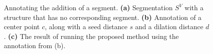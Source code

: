 \documentclass[]{spie}  %
\begin{document}
\begin{figure}[htbp]
\centering
{}
\hspace{0.1em}
\hspace{0.1em}
\caption{Annotating the addition of a segment.  \textbf{(a)}
  Segmentation $S^V$ with a structure that has no corresponding
  segment.  \textbf{(b)} Annotation of a center point $c$, along with
  a seed distance $s$ and a dilation distance $d$.  \textbf{(c)} The
  result of running the proposed method using the annotation from
  (b).} \label{fig:addition-ex}
\end{figure}
\end{document}
